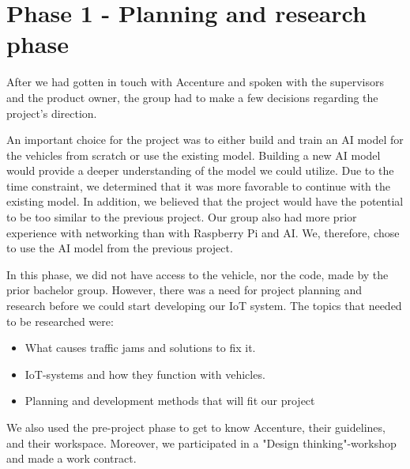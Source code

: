 \section{Phase 1 - Planning and research phase}\label{sec:phase1}

After we had gotten in touch with Accenture and spoken with the supervisors and the product owner, the group had to make a few decisions regarding the project's direction.

An important choice for the project was to either build and train an AI model for the vehicles from scratch or use the existing model. Building a new AI model would provide a deeper understanding of the model we could utilize. Due to the time constraint, we determined that it was more favorable to continue with the existing model. In addition, we believed that the project would have the potential to be too similar to the previous project.  Our group also had more prior experience with networking than with Raspberry Pi and AI. We, therefore, chose to use the AI model from the previous project. 

In this phase, we did not have access to the vehicle, nor the code, made by the prior bachelor group. However, there was a need for project planning and research before we could start developing our IoT system. The topics that needed to be researched were:

\begin{itemize}
\item What causes traffic jams and solutions to fix it.
\item IoT-systems and how they function with vehicles.
\item Planning and development methods that will fit our project
\end{itemize}

We also used the pre-project phase to get to know Accenture, their guidelines, and their workspace. Moreover, we participated in a "Design thinking"-workshop and made a work contract. 









\clearpage